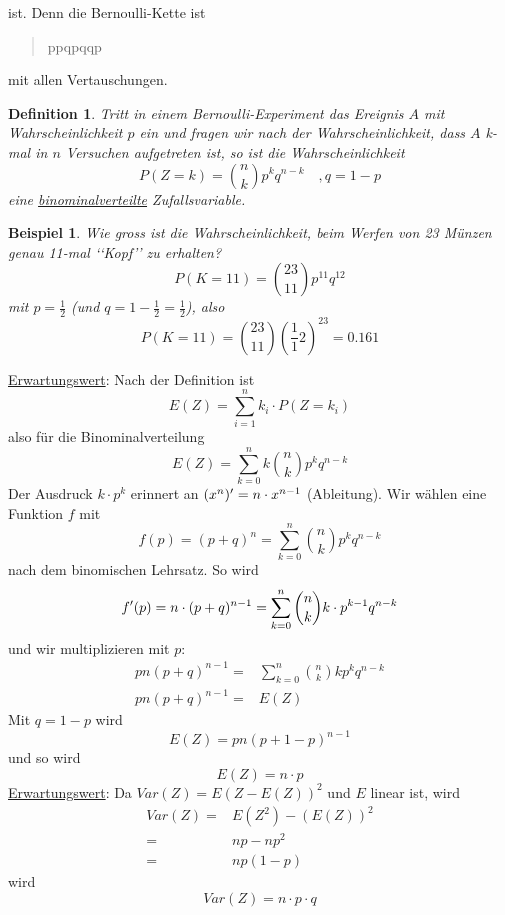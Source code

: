 \documentclass{report}
\newtheorem{mydef}{Definition}
\newtheorem{myexample}{Beispiel}
\begin{document}
ist. Denn die Bernoulli-Kette ist
\begin{quote}
ppqpqqp
\end{quote}
mit allen Vertauschungen.
\begin{mydef}Tritt in einem Bernoulli-Experiment das Ereignis $A$ mit Wahrscheinlichkeit $p$ ein und fragen wir nach der Wahrscheinlichkeit, dass $A$ k-mal in $n$ Versuchen aufgetreten ist, so ist die Wahrscheinlichkeit
\begin{equation}
P(Z=k) = \binom{n}{k} p^kq^{n-k} \quad , q=1-p
\end{equation}
eine \underline{binominalverteilte} Zufallsvariable.
\end{mydef}
\begin{myexample}
Wie gross ist die Wahrscheinlichkeit, beim Werfen von 23 Münzen genau 11-mal \lq\lq{}Kopf\rq\rq{} zu erhalten?
\begin{equation}
P(K=11) = \binom{23}{11} p^11 q^12
\end{equation}
mit $p = \frac{1}{2}$ (und $q = 1 - \frac{1}{2} = \frac{1}{2}$), also
\begin{equation}
P(K=11) = \binom{23}{11} (\frac1{1}{2})^23 = 0.161
\end{equation}
\end{myexample}
\underline{Erwartungswert}: Nach der Definition ist
\begin{equation}
E(Z) = \sum_{i=1}^n{k_i \cdot P(Z=k_i)}
\end{equation}
also für die Binominalverteilung
\begin{equation}
E(Z) = \sum_{k=0}^n{k \binom{n}{k} p^k q^{n-k}}
\end{equation}
Der Ausdruck $k \cdot p^k$ erinnert an $(x^n)\rq{} = n \cdot x^{n-1}$ (Ableitung). Wir wählen eine Funktion $f$ mit
\begin{equation}
f(p) = (p + q)^n = \sum_{k=0}^n{\binom{n}{k} p^k q^{n-k}}
\end{equation}
nach dem binomischen Lehrsatz. So wird
\begin{equation}
f\rq{}(p) = n \cdot (p+q)^{n-1} = \sum_{k=0}^n{\binom{n}{k} k \cdot p^{k-1} q^{n-k}}
\end{equation}
und wir multiplizieren mit $p$:
\begin{align*}
pn(p+q)^{n-1} = & \sum_{k=0}^n{\binom{n}{k} k p^k q^{n-k}}\\
pn(p+q)^{n-1} = & E(Z)
\end{align*}
Mit $q = 1 - p$ wird
\begin{equation}
E(Z) = pn(p+1-p)^{n-1}
\end{equation}
und so wird
\begin{equation}
E(Z) = n \cdot p
\end{equation}
\underline{Erwartungswert}: Da $Var(Z) = E(Z - E(Z))^2$ und $E$ linear ist, wird
\begin{align*}
Var(Z) = & E(Z^2) - (E(Z))^2\\
= & np -np^2\\
= & np (1-p)
\end{align*}
wird
\begin{equation}
Var(Z) = n \cdot p \cdot q
\end{equation}
\end{document}
